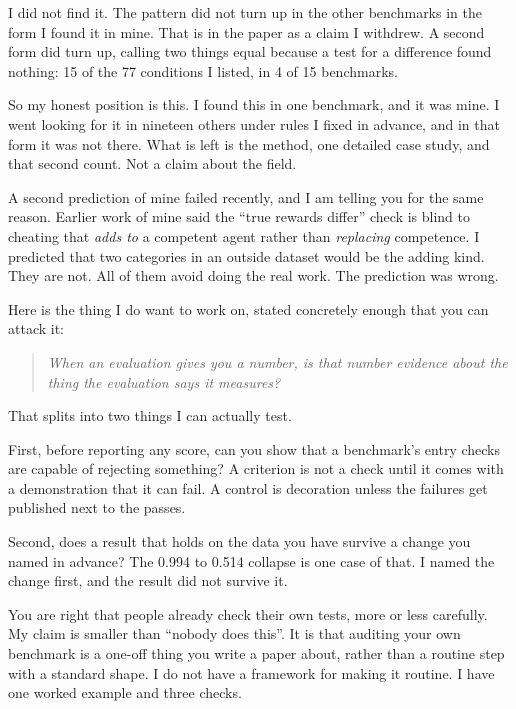 \documentclass[11pt,a4paper]{article}
\begin{document}
I did not find it. The pattern did not turn up in the other benchmarks in the form
I found it in mine. That is in the paper as a claim I withdrew. A second form did
turn up, calling two things equal because a test for a difference found nothing: 15
of the 77 conditions I listed, in 4 of 15 benchmarks.

So my honest position is this. I found this in one benchmark, and it was mine. I
went looking for it in nineteen others under rules I fixed in advance, and in that
form it was not there. What is left is the method, one detailed case study, and that
second count. Not a claim about the field.

A second prediction of mine failed recently, and I am telling you for the same
reason. Earlier work of mine said the ``true rewards differ'' check is blind to
cheating that \emph{adds to} a competent agent rather than \emph{replacing}
competence. I predicted that two categories in an outside dataset would be the
adding kind. They are not. All of them avoid doing the real work. The prediction
was wrong.

Here is the thing I do want to work on, stated concretely enough that you can
attack it:

\vspace{0.4em}
\begin{quote}
\emph{When an evaluation gives you a number, is that number evidence about the
thing the evaluation says it measures?}
\end{quote}
\vspace{0.4em}

That splits into two things I can actually test.

First, before reporting any score, can you show that a benchmark's entry checks are
capable of rejecting something? A criterion is not a check until it comes with a
demonstration that it can fail. A control is decoration unless the failures get
published next to the passes.

Second, does a result that holds on the data you have survive a change you named in
advance? The 0.994 to 0.514 collapse is one case of that. I named the change first,
and the result did not survive it.

You are right that people already check their own tests, more or less carefully. My
claim is smaller than ``nobody does this''. It is that auditing your own benchmark
is a one-off thing you write a paper about, rather than a routine step with a
standard shape. I do not have a framework for making it routine. I have one worked
example and three checks.
\end{document}
